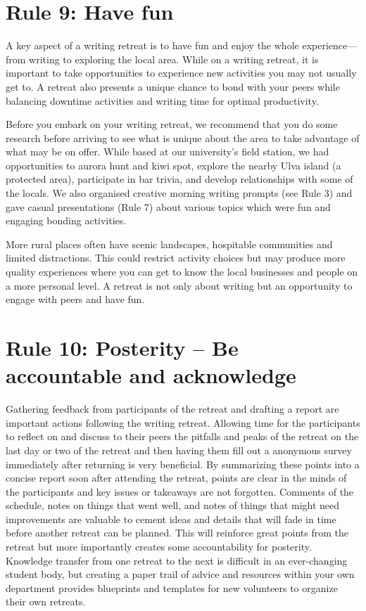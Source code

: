 \documentclass[10pt,letterpaper]{article}
\begin{document}
\section*{Rule 9: Have fun}

A key aspect of a writing retreat is to have fun and enjoy the whole experience---from writing to exploring the local area. While on a writing retreat, it is important to take opportunities to experience new activities you may not usually get to. A retreat also presents a unique chance to bond with your peers while balancing downtime activities and writing time for optimal productivity.

Before you embark on your writing retreat, we recommend that you do some research before arriving to see what is unique about the area to take advantage of what may be on offer. While based at our university’s field station, we had opportunities to aurora hunt and kiwi spot, explore the nearby Ulva island (a protected area), participate in bar trivia, and develop relationships with some of the locals. We also organised creative morning writing prompts (see Rule 3) and gave casual presentations (Rule 7) about various topics which were fun and engaging bonding activities.

More rural places often have scenic landscapes, hospitable communities and limited distractions. This could restrict activity choices but may produce more quality experiences where you can get to know the local businesses and people on a more personal level. A retreat is not only about writing but an opportunity to engage with peers and have fun.

\section*{Rule 10: Posterity -- Be accountable and acknowledge}

Gathering feedback from participants of the retreat and drafting a report are important actions following the writing retreat. Allowing time for the participants to reflect on and discuss to their peers the pitfalls and peaks of the retreat on the last day or two of the retreat and then having them fill out a anonymous survey immediately after returning is very beneficial. By summarizing these points into a concise report soon after attending the retreat, points are clear in the minds of the participants and key issues or takeaways are not forgotten. Comments of the schedule, notes on things that went well, and notes of things that might need improvements are valuable to cement ideas and details that will fade in time before another retreat can be planned. This will reinforce great points from the retreat but more importantly creates some accountability for posterity. Knowledge transfer from one retreat to the next is difficult in an ever-changing student body, but creating a paper trail of advice and resources within your own department provides blueprints and templates for new volunteers to organize their own retreats. 
\end{document}
